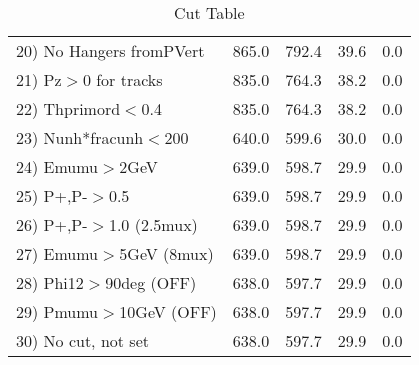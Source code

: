 \begin{table}[h!]
\begin{tabular}{||l||r|r|r|r||}
 20) No Hangers fromPVert &       865.0 &       792.4 &        39.6 &         0.0 \\
 21) Pz$>$0 for tracks    &       835.0 &       764.3 &        38.2 &         0.0 \\
 22) Thprimord$<$0.4      &       835.0 &       764.3 &        38.2 &         0.0 \\
 23) Nunh*fracunh$<$200   &       640.0 &       599.6 &        30.0 &         0.0 \\
 24) Emumu$>$2GeV         &       639.0 &       598.7 &        29.9 &         0.0 \\
 25) P+,P-$>$0.5          &       639.0 &       598.7 &        29.9 &         0.0 \\
 26) P+,P-$>$1.0 (2.5mux) &       639.0 &       598.7 &        29.9 &         0.0 \\
 27) Emumu$>$5GeV  (8mux) &       639.0 &       598.7 &        29.9 &         0.0 \\
 28) Phi12$>$90deg  (OFF) &       638.0 &       597.7 &        29.9 &         0.0 \\
 29) Pmumu$>$10GeV  (OFF) &       638.0 &       597.7 &        29.9 &         0.0 \\
 30) No cut, not set      &       638.0 &       597.7 &        29.9 &         0.0 \\
 \hline
 \hline
 \end{tabular}
 \caption{Cut Table \cohrp  }
 \label{tab-cut_crhop}
 \end{table}
